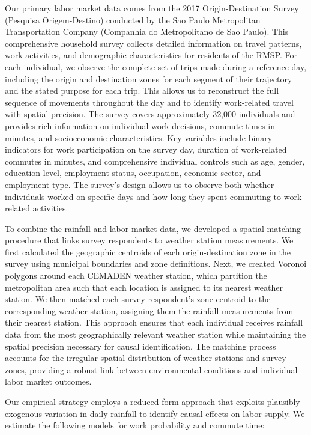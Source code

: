 Our primary labor market data comes from the 2017 Origin-Destination Survey (Pesquisa Origem-Destino) conducted by the Sao Paulo Metropolitan Transportation Company (Companhia do Metropolitano de Sao Paulo). This comprehensive household survey collects detailed information on travel patterns, work activities, and demographic characteristics for residents of the RMSP. For each individual, we observe the complete set of trips made during a reference day, including the origin and destination zones for each segment of their trajectory and the stated purpose for each trip. This allows us to reconstruct the full sequence of movements throughout the day and to identify work-related travel with spatial precision. The survey covers approximately 32,000 individuals and provides rich information on individual work decisions, commute times in minutes, and socioeconomic characteristics. Key variables include binary indicators for work participation on the survey day, duration of work-related commutes in minutes, and comprehensive individual controls such as age, gender, education level, employment status, occupation, economic sector, and employment type. The survey's design allows us to observe both whether individuals worked on specific days and how long they spent commuting to work-related activities.

To combine the rainfall and labor market data, we developed a spatial matching procedure that links survey respondents to weather station measurements. We first calculated the geographic centroids of each origin-destination zone in the survey using municipal boundaries and zone definitions. Next, we created Voronoi polygons around each CEMADEN weather station, which partition the metropolitan area such that each location is assigned to its nearest weather station. We then matched each survey respondent's zone centroid to the corresponding weather station, assigning them the rainfall measurements from their nearest station. This approach ensures that each individual receives rainfall data from the most geographically relevant weather station while maintaining the spatial precision necessary for causal identification. The matching process accounts for the irregular spatial distribution of weather stations and survey zones, providing a robust link between environmental conditions and individual labor market outcomes.

Our empirical strategy employs a reduced-form approach that exploits plausibly exogenous variation in daily rainfall to identify causal effects on labor supply. We estimate the following models for work probability and commute time:

